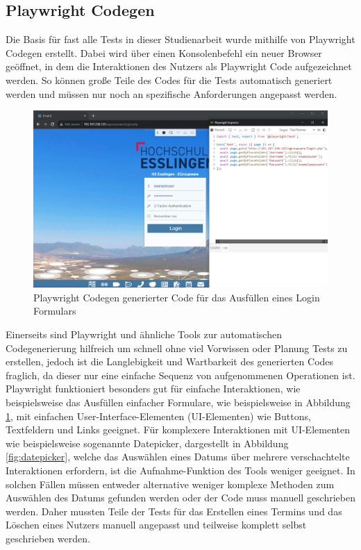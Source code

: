 \subsection*{Playwright Codegen}

Die Basis für fast alle Tests in dieser Studienarbeit wurde mithilfe von Playwright Codegen erstellt.
Dabei wird über einen Konsolenbefehl ein neuer Browser geöffnet, in dem die Interaktionen des Nutzers als Playwright Code aufgezeichnet werden.
So können große Teile des Codes für die Tests automatisch generiert werden und müssen nur noch an spezifische Anforderungen angepasst werden.
\begin{figure}[H]
    \centering
    \includegraphics[width=1\textwidth]{images/Playwright_Codegen.png}
    \caption{Playwright Codegen generierter Code für das Ausfüllen eines Login Formulars}
    \label{fig:playwright-codegen}
\end{figure}

Einerseits sind Playwright und ähnliche Tools zur automatischen Codegenerierung hilfreich um schnell ohne viel Vorwissen oder Planung Tests zu erstellen, jedoch ist die Langlebigkeit und Wartbarkeit des generierten Codes fraglich, da dieser nur eine \glqq einfache Sequenz von aufgenommenen Operationen \grqq \autocite[][294]{automating-e2e-manual} ist.
Playwright funktioniert besonders gut für einfache Interaktionen, wie beispielsweise das Ausfüllen einfacher Formulare, wie beispielsweise in Abbildung \ref{fig:playwright-codegen}, mit einfachen User-Interface-Elementen (UI-Elementen) wie Buttons, Textfeldern und Links geeignet.
Für komplexere Interaktionen mit UI-Elementen wie beispielsweise sogenannte Datepicker, dargestellt in Abbildung \ref{fig:datepicker}, welche das Auswählen eines Datums über mehrere verschachtelte Interaktionen erfordern, ist die Aufnahme-Funktion des Tools weniger geeignet.
In solchen Fällen müssen entweder alternative weniger komplexe Methoden zum Auswählen des Datums gefunden werden oder der Code muss manuell geschrieben werden.
Daher mussten Teile der Tests für das Erstellen eines Termins und das Löschen eines Nutzers manuell angepasst und teilweise komplett selbst geschrieben werden.


